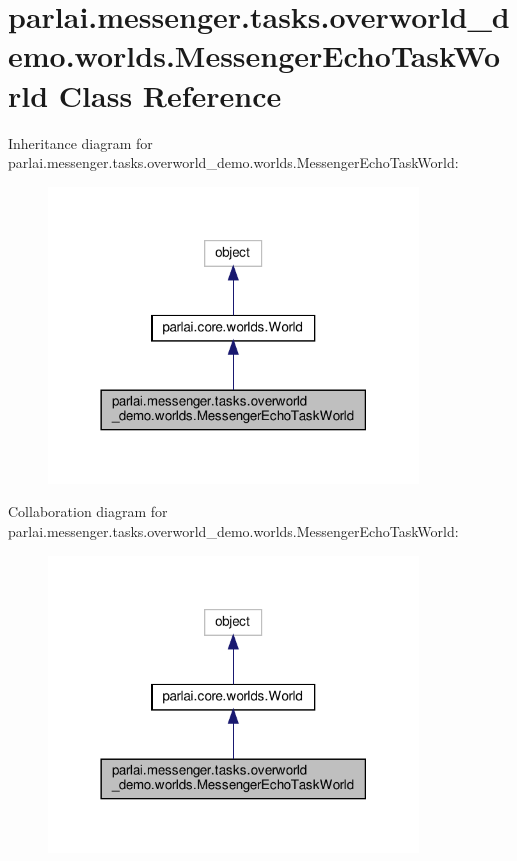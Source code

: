 \hypertarget{classparlai_1_1messenger_1_1tasks_1_1overworld__demo_1_1worlds_1_1MessengerEchoTaskWorld}{}\section{parlai.\+messenger.\+tasks.\+overworld\+\_\+demo.\+worlds.\+Messenger\+Echo\+Task\+World Class Reference}
\label{classparlai_1_1messenger_1_1tasks_1_1overworld__demo_1_1worlds_1_1MessengerEchoTaskWorld}


Inheritance diagram for parlai.\+messenger.\+tasks.\+overworld\+\_\+demo.\+worlds.\+Messenger\+Echo\+Task\+World\+:
\nopagebreak
\begin{figure}[H]
\begin{center}
\leavevmode
\includegraphics[width=278pt]{classparlai_1_1messenger_1_1tasks_1_1overworld__demo_1_1worlds_1_1MessengerEchoTaskWorld__inherit__graph}
\end{center}
\end{figure}


Collaboration diagram for parlai.\+messenger.\+tasks.\+overworld\+\_\+demo.\+worlds.\+Messenger\+Echo\+Task\+World\+:
\nopagebreak
\begin{figure}[H]
\begin{center}
\leavevmode
\includegraphics[width=278pt]{classparlai_1_1messenger_1_1tasks_1_1overworld__demo_1_1worlds_1_1MessengerEchoTaskWorld__coll__graph}
\end{center}
\end{figure}
